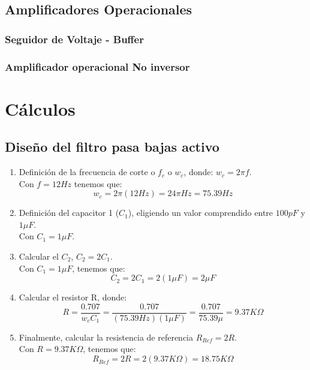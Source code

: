 \documentclass[12pt]{article}
\begin{document}
	    \subsection{Amplificadores Operacionales}
	        \subsubsection{Seguidor de Voltaje - Buffer}
	        \subsubsection{Amplificador operacional No inversor}


	\section{Cálculos}
		\subsection{Diseño del filtro pasa bajas activo}
		\begin{enumerate}
			\item Definición de la frecuencia de corte o $f_{c}$ o $w_{c}$, donde: $w_{c}=2 \pi f$.					\\
					Con $ f=12Hz $ tenemos que:
					$$ w_{c}=2\pi (12Hz) = 24 \pi Hz = 75.39 Hz $$
			\item Definición del capacitor 1 ($C_{1}$), eligiendo un valor comprendido entre $100pF$ y $1\mu F$.	\\
					Con $C_{1}=1\mu F$.
			\item Calcular el $C_{2}$,  $C_{2}=2C_{1}$.																\\
					Con $C_{1}=1\mu F$, tenemos que:
					$$ C_{2}=2C_{1} = 2(1\mu F) = 2 \mu F $$
			\item Calcular el resistor R, donde:																	\\
					$$ R = \frac{0.707}{w_{c}C_{1}} = \frac{0.707}{(75.39 Hz)(1 \mu F)} = \frac{0.707}{75.39\mu} = 9.37 K\Omega $$
			\newpage
		    \item Finalmente, calcular la resistencia de referencia $R_{Ref}=2R$.\\
		    Con $R=9.37 K\Omega $, tenemos que:
		    $$ R_{Ref}=2R = 2(9.37 K\Omega) = 18.75 K\Omega $$
		    

		\end{enumerate}
\end{document}
